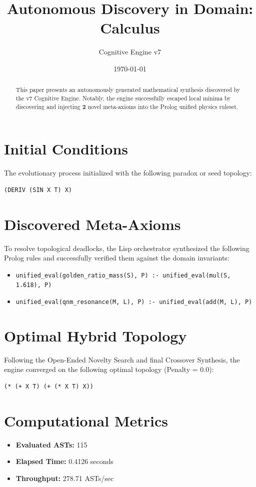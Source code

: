 \documentclass{article}
\title{Autonomous Discovery in Domain: Calculus}
\author{Cognitive Engine v7}
\date{\today}
\begin{document}
\maketitle
\begin{abstract}
This paper presents an autonomously generated mathematical synthesis discovered by the v7 Cognitive Engine. Notably, the engine successfully escaped local minima by discovering and injecting \textbf{2} novel meta-axioms into the Prolog unified physics ruleset.\end{abstract}
\section{Initial Conditions}
The evolutionary process initialized with the following paradox or seed topology:
\begin{verbatim}
(DERIV (SIN X T) X)
\end{verbatim}
\section{Discovered Meta-Axioms}
To resolve topological deadlocks, the Lisp orchestrator synthesized the following Prolog rules and successfully verified them against the domain invariants:
\begin{itemize}
  \item \texttt{unified_eval(golden_ratio_mass(S), P) :- unified_eval(mul(S, 1.618), P)}
  \item \texttt{unified_eval(qnm_resonance(M, L), P) :- unified_eval(add(M, L), P)}
\end{itemize}
\section{Optimal Hybrid Topology}
Following the Open-Ended Novelty Search and final Crossover Synthesis, the engine converged on the following optimal topology (Penalty = 0.0):
\begin{verbatim}
(* (+ X T) (+ (* X T) X))
\end{verbatim}
\section{Computational Metrics}
\begin{itemize}
  \item \textbf{Evaluated ASTs:} 115
  \item \textbf{Elapsed Time:} 0.4126 seconds
  \item \textbf{Throughput:} 278.71 ASTs/sec
\end{itemize}
\end{document}
